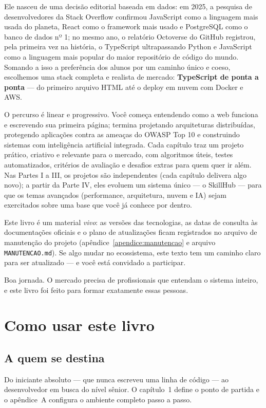 Ele nasceu de uma decisão editorial baseada em dados: em 2025, a pesquisa de
desenvolvedores da Stack Overflow confirmou JavaScript como a linguagem mais
usada do planeta, React como o framework mais usado e PostgreSQL como o banco
de dados nº 1; no mesmo ano, o relatório Octoverse do GitHub registrou, pela
primeira vez na história, o TypeScript ultrapassando Python e JavaScript como a
linguagem mais popular do maior repositório de código do mundo. Somando a isso
a preferência dos alunos por um caminho único e coeso, escolhemos uma stack
completa e realista de mercado: \textbf{TypeScript de ponta a ponta} — do
primeiro arquivo HTML até o deploy em nuvem com Docker e AWS.

O percurso é linear e progressivo. Você começa entendendo como a web funciona e
escrevendo sua primeira página; termina projetando arquiteturas distribuídas,
protegendo aplicações contra as ameaças do OWASP Top 10 e construindo sistemas
com inteligência artificial integrada. Cada capítulo traz um
projeto prático, criativo e relevante para o mercado, com algoritmos úteis,
testes automatizados, critérios de avaliação e desafios extras para quem quer
ir além. Nas Partes I a III, os projetos são independentes (cada capítulo
delivera algo novo); a partir da Parte IV, eles evoluem um sistema único — o
SkillHub — para que os temas avançados (performance, arquitetura, nuvem e IA)
sejam exercitados sobre uma base que você já conhece por dentro.

Este livro é um material \emph{vivo}: as versões das tecnologias, as datas de
consulta às documentações oficiais e o plano de atualizações ficam registrados
no arquivo de manutenção do projeto (apêndice~\ref{apendice:manutencao} e
arquivo \texttt{MANUTENCAO.md}). Se algo mudar no ecossistema, este texto tem um
caminho claro para ser atualizado — e você está convidado a participar.

Boa jornada. O mercado precisa de profissionais que entendam o sistema inteiro,
e este livro foi feito para formar exatamente essas pessoas.

\clearpage

\chapter*{Como usar este livro}

\section*{A quem se destina}
Do iniciante absoluto — que nunca escreveu uma linha de código — ao
desenvolvedor em busca do nível sênior. O capítulo~1 define o ponto de partida
e o apêndice~A configura o ambiente completo passo a passo.

